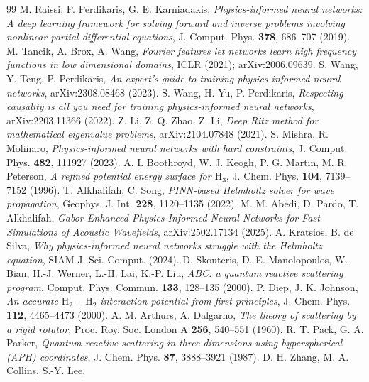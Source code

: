 \documentclass[11pt,a4paper]{article}
\begin{document}
\begin{thebibliography}{99}
 M. Raissi, P. Perdikaris, G. E. Karniadakis,
\emph{Physics-informed neural networks: A deep learning framework for solving
forward and inverse problems involving nonlinear partial differential equations},
J. Comput. Phys. \textbf{378}, 686--707 (2019).
 M. Tancik, A. Brox, A. Wang,
\emph{Fourier features let networks learn high frequency functions in low
dimensional domains}, ICLR (2021); arXiv:2006.09639.
 S. Wang, Y. Teng, P. Perdikaris,
\emph{An expert's guide to training physics-informed neural networks},
arXiv:2308.08468 (2023).
 S. Wang, H. Yu, P. Perdikaris,
\emph{Respecting causality is all you need for training physics-informed neural
networks}, arXiv:2203.11366 (2022).
 Z. Li, Z. Q. Zhao, Z. Li, \emph{Deep Ritz method for
mathematical eigenvalue problems}, arXiv:2104.07848 (2021).
 S. Mishra, R. Molinaro, \emph{Physics-informed neural
networks with hard constraints}, J. Comput. Phys. \textbf{482}, 111927 (2023).
 A. I. Boothroyd, W. J. Keogh, P. G. Martin, M. R. Peterson,
\emph{A refined potential energy surface for $\mathrm{H}_3$},
J. Chem. Phys. \textbf{104}, 7139--7152 (1996).
 T. Alkhalifah, C. Song,
\emph{PINN-based Helmholtz solver for wave propagation},
Geophys. J. Int. \textbf{228}, 1120--1135 (2022).
 M. M. Abedi, D. Pardo, T. Alkhalifah,
\emph{Gabor-Enhanced Physics-Informed Neural Networks for Fast Simulations of Acoustic Wavefields},
arXiv:2502.17134 (2025).
 A. Kratsios, B. de Silva,
\emph{Why physics-informed neural networks struggle with the Helmholtz equation},
SIAM J. Sci. Comput. (2024).
 D. Skouteris, D. E. Manolopoulos, W. Bian, H.-J. Werner, L.-H. Lai, K.-P. Liu,
\emph{ABC: a quantum reactive scattering program},
Comput. Phys. Commun. \textbf{133}, 128--135 (2000).
 P. Diep, J. K. Johnson,
\emph{An accurate $\mathrm{H}_2-\mathrm{H}_2$ interaction potential from first principles},
J. Chem. Phys. \textbf{112}, 4465--4473 (2000).
 A. M. Arthurs, A. Dalgarno,
\emph{The theory of scattering by a rigid rotator},
Proc. Roy. Soc. London A \textbf{256}, 540--551 (1960).
 R. T. Pack, G. A. Parker,
\emph{Quantum reactive scattering in three dimensions using hyperspherical (APH) coordinates},
J. Chem. Phys. \textbf{87}, 3888--3921 (1987).
 D. H. Zhang, M. A. Collins, S.-Y. Lee,

\end{thebibliography}
\end{document}
